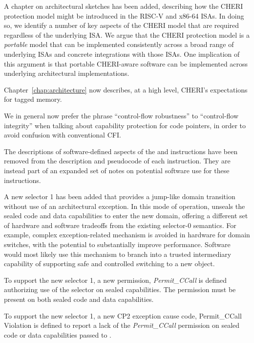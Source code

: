 \begin{description}
  A chapter on architectural sketches has been added, describing how the CHERI
  protection model might be introduced in the RISC-V and x86-64 ISAs.
  In doing so, we identify a number of key aspects of the CHERI model that are
  required regardless of the underlying ISA.
  We argue that the CHERI protection model is a \textit{portable} model that can
  be implemented consistently across a broad range of underlying ISAs and
  concrete integrations with those ISAs.
  One implication of this argument is that portable CHERI-aware software can be
  implemented across underlying architectural implementations.

  Chapter~\ref{chap:architecture} now describes, at a high level, CHERI's
  expectations for tagged memory.

  We in general now prefer the phrase ``control-flow robustness'' to
  ``control-flow integrity'' when talking about capability protection for code
  pointers, in order to avoid confusion with conventional CFI.

  The descriptions of software-defined aspects of the  and
   instructions have been removed from the description and
  pseudocode of each instruction.
  They are instead part of an expanded set of notes on potential software use
  for these instructions.

  A new  selector 1 has been added that provides a jump-like
  domain transition without use of an architectural exception.
  In this mode of operation,  unseals the sealed code and
  data capabilities to enter the new domain, offering a different set of 
  hardware and software tradeoffs from the existing selector-0 semantics.
  For example, complex exception-related mechanism is avoided in hardware for
  domain switches, with the potential to substantially improve performance.
  Software would most likely use this mechanism to branch into a trusted
  intermediary capability of supporting safe and controlled switching to a new
  object.

  To support the new  selector 1, a new permission,
  \emph{Permit\_CCall} is defined authorizing use of the selector on sealed
  capabilities.
  The permission must be present on both sealed code and data capabilities.

  To support the new  selector 1, a new CP2 exception cause
  code, Permit\_CCall Violation is defined to report a lack of the
  \emph{Permit\_CCall} permission on sealed code or data capabilities passed to
  .


\end{description}
